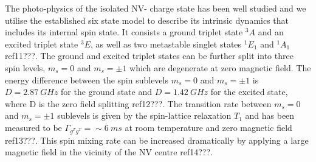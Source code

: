 \documentclass[prl]{revtex4}
\begin{document}
The photo-physics of the isolated NV- charge state has been well studied and we utilise the established six state model to describe its intrinsic dynamics that includes its internal spin state. It consists a ground triplet state $^3A$ and an excited triplet state $^3E$, as well as two metastable singlet states $^1E_1$ and $^1A_1$ ref11???. The ground and excited triplet states can be further split into three spin levels, $m_s=0$ and $m_s=\pm1$ which are degenerate at zero magnetic field. The energy difference between the spin sublevels $m_s=0$ and $m_s=\pm1$ is $D=\SI{2.87}{GHz}$ for the ground state and $D=\SI{1.42}{GHz}$ for the excited state, where D is the zero field splitting ref12???. The transition rate between $m_s=0$ and $m_s=\pm1$ sublevels is given by the spin-lattice relaxation $T_1$ and has been measured to be $\Gamma_{g^Tg^T} = \sim\SI{6}{ms}$ at room temperature and zero magnetic field ref13???. This spin mixing rate can be increased dramatically by applying a large magnetic field in the vicinity of the NV centre ref14???.
\end{document}

